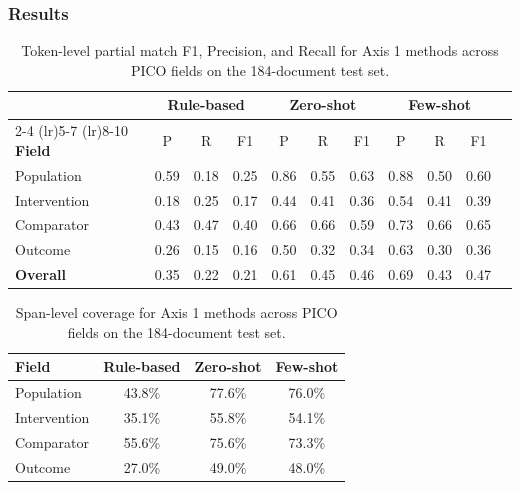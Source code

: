 \documentclass{article}
\begin{document}
\subsubsection{Results}

\begin{table}[h]
\centering
\caption{Token-level partial match F1, Precision, and Recall for Axis 1 methods across PICO fields on the 184-document test set.}
\label{tab:axis1_results}
\begin{tabular}{lcccccccccc}
\toprule
& \multicolumn{3}{c}{\textbf{Rule-based}} & \multicolumn{3}{c}{\textbf{Zero-shot}} & \multicolumn{3}{c}{\textbf{Few-shot}} \\
\cmidrule(lr){2-4} \cmidrule(lr){5-7} \cmidrule(lr){8-10}
\textbf{Field} & P & R & F1 & P & R & F1 & P & R & F1 \\
\midrule
Population    & 0.59 & 0.18 & 0.25 & 0.86 & 0.55 & 0.63 & 0.88 & 0.50 & 0.60 \\
Intervention  & 0.18 & 0.25 & 0.17 & 0.44 & 0.41 & 0.36 & 0.54 & 0.41 & 0.39 \\
Comparator    & 0.43 & 0.47 & 0.40 & 0.66 & 0.66 & 0.59 & 0.73 & 0.66 & 0.65 \\
Outcome       & 0.26 & 0.15 & 0.16 & 0.50 & 0.32 & 0.34 & 0.63 & 0.30 & 0.36 \\
\midrule
\textbf{Overall} & 0.35 & 0.22 & 0.21 & 0.61 & 0.45 & 0.46 & 0.69 & 0.43 & 0.47 \\
\bottomrule
\end{tabular}
\end{table}

\begin{table}[h]
\centering
\caption{Span-level coverage for Axis 1 methods across PICO fields on the 184-document test set.}
\label{tab:axis1_coverage}
\begin{tabular}{lccc}
\toprule
\textbf{Field} & \textbf{Rule-based} & \textbf{Zero-shot} & \textbf{Few-shot} \\
\midrule
Population   & 43.8\% & 77.6\% & 76.0\% \\
Intervention & 35.1\% & 55.8\% & 54.1\% \\
Comparator   & 55.6\% & 75.6\% & 73.3\% \\
Outcome      & 27.0\% & 49.0\% & 48.0\% \\
\bottomrule
\end{tabular}
\end{table}
\end{document}
